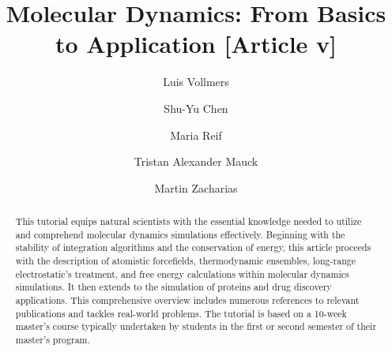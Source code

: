 \documentclass[9pt,tutorial]{livecoms}
\title{Molecular Dynamics: From Basics to Application [Article v\versionnumber]}
\author[1*\authfn{1}]{Luis Vollmers}
\author[2\authfn{1}\authfn{3}]{Shu-Yu Chen}
\author[1\authfn{4}]{Maria Reif}
\author[1]{Tristan Alexander Mauck}
\author[1*]{Martin Zacharias}
\affil[1]{Technical University of Munich TUM}
\affil[2]{Eidgenössische Technische Hochschule Zürich}
\begin{document}
\begin{frontmatter}
\maketitle

\begin{abstract}
This tutorial equips natural scientists with the essential knowledge needed to utilize and comprehend molecular dynamics simulations effectively. Beginning with the stability of integration algorithms and the conservation of energy, this article proceeds with the description of atomistic forcefields, thermodynamic ensembles, long-range electrostatic's treatment, and free energy calculations within molecular dynamics simulations. It then extends to the simulation of proteins and drug discovery applications. This comprehensive overview includes numerous references to relevant publications and tackles real-world problems. The tutorial is based on a 10-week master's course typically undertaken by students in the first or second semester of their master's program.
\end{abstract}

\end{frontmatter}
\end{document}
